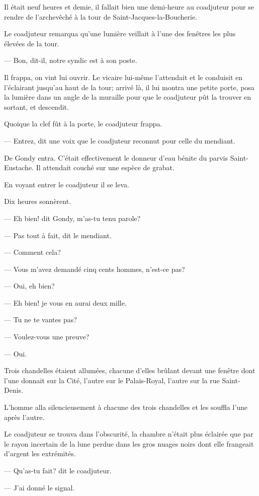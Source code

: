 Il était neuf heures et demie, il fallait bien une demi-heure au coadjuteur pour se rendre de l'archevêché à la tour de Saint-Jacques-la-Boucherie.

Le coadjuteur remarqua qu'une lumière veillait à l'une des fenêtres les plus élevées de la tour.

— Bon, dit-il, notre syndic est à son poste.

Il frappa, on vint lui ouvrir. Le vicaire lui-même l'attendait et le conduisit en l'éclairant jusqu'au haut de la tour; arrivé là, il lui montra une petite porte, posa la lumière dans un angle de la muraille pour que le coadjuteur pût la trouver en sortant, et descendit.

Quoique la clef fût à la porte, le coadjuteur frappa.

— Entrez, dit une voix que le coadjuteur reconnut pour celle du mendiant.

De Gondy entra. C'était effectivement le donneur d'eau bénite du parvis Saint-Eustache. Il attendait couché sur une espèce de grabat.

En voyant entrer le coadjuteur il se leva.

Dix heures sonnèrent.

— Eh bien! dit Gondy, m'as-tu tenu parole?

— Pas tout à fait, dit le mendiant.

— Comment cela?

— Vous m'avez demandé cinq cents hommes, n'est-ce pas?

— Oui, eh bien?

— Eh bien! je vous en aurai deux mille.

— Tu ne te vantes pas?

— Voulez-vous une preuve?

— Oui.

Trois chandelles étaient allumées, chacune d'elles brûlant devant une fenêtre dont l'une donnait sur la Cité, l'autre sur le Palais-Royal, l'autre sur la rue Saint-Denis.

L'homme alla silencieusement à chacune des trois chandelles et les souffla l'une après l'autre.

Le coadjuteur se trouva dans l'obscurité, la chambre n'était plus éclairée que par le rayon incertain de la lune perdue dans les gros nuages noirs dont elle frangeait d'argent les extrémités.

— Qu'as-tu fait? dit le coadjuteur.

— J'ai donné le signal.

